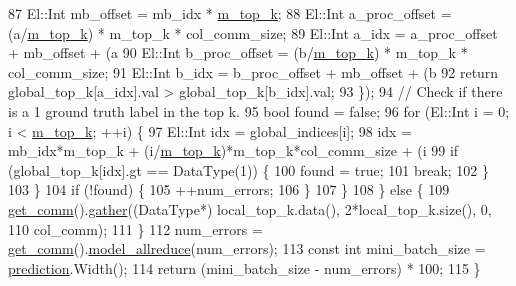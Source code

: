 \begin{DoxyCode}
87             El::Int mb\_offset = mb\_idx * \hyperlink{classlbann_1_1top__k__categorical__accuracy__metric_a6cc172f6799bffac44de06d0657efdeb}{m\_top\_k};
88             El::Int a\_proc\_offset = (a/\hyperlink{classlbann_1_1top__k__categorical__accuracy__metric_a6cc172f6799bffac44de06d0657efdeb}{m\_top\_k}) * m\_top\_k * col\_comm\_size;
89             El::Int a\_idx = a\_proc\_offset + mb\_offset + (a%
90             El::Int b\_proc\_offset = (b/\hyperlink{classlbann_1_1top__k__categorical__accuracy__metric_a6cc172f6799bffac44de06d0657efdeb}{m\_top\_k}) * m\_top\_k * col\_comm\_size;
91             El::Int b\_idx = b\_proc\_offset + mb\_offset + (b%
92             \textcolor{keywordflow}{return} global\_top\_k[a\_idx].val > global\_top\_k[b\_idx].val;
93           \});
94         \textcolor{comment}{// Check if there is a 1 ground truth label in the top k.}
95         \textcolor{keywordtype}{bool} found = \textcolor{keyword}{false};
96         \textcolor{keywordflow}{for} (El::Int i = 0; i < \hyperlink{classlbann_1_1top__k__categorical__accuracy__metric_a6cc172f6799bffac44de06d0657efdeb}{m\_top\_k}; ++i) \{
97           El::Int idx = global\_indices[i];
98           idx = mb\_idx*m\_top\_k + (i/\hyperlink{classlbann_1_1top__k__categorical__accuracy__metric_a6cc172f6799bffac44de06d0657efdeb}{m\_top\_k})*m\_top\_k*col\_comm\_size + (i%
99           \textcolor{keywordflow}{if} (global\_top\_k[idx].gt == DataType(1)) \{
100             found = \textcolor{keyword}{true};
101             \textcolor{keywordflow}{break};
102           \}
103         \}
104         \textcolor{keywordflow}{if} (!found) \{
105           ++num\_errors;
106         \}
107       \}
108     \} \textcolor{keywordflow}{else} \{
109       \hyperlink{classlbann_1_1metric_a464120720df6bfdf91bffe353e562964}{get\_comm}().\hyperlink{classlbann_1_1lbann__comm_aa784298e6ed0f9f01a20b179d5110df9}{gather}((DataType*) local\_top\_k.data(), 2*local\_top\_k.size(), 0,
110                         col\_comm);
111     \}
112     num\_errors = \hyperlink{classlbann_1_1metric_a464120720df6bfdf91bffe353e562964}{get\_comm}().\hyperlink{classlbann_1_1lbann__comm_aebb6290d1b618eace302404291c598a5}{model\_allreduce}(num\_errors);
113     \textcolor{keyword}{const} \textcolor{keywordtype}{int} mini\_batch\_size = \hyperlink{base_8hpp_a2781a159088df64ed7d47cc91c4dc0a8ac41b9ec75e920b610e8907e066074b30}{prediction}.Width();
114     \textcolor{keywordflow}{return} (mini\_batch\_size - num\_errors) * 100;
115 \}
\end{DoxyCode}
